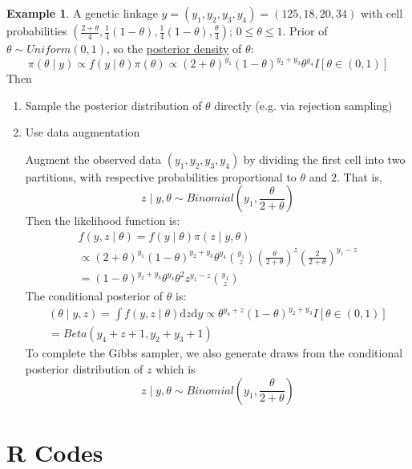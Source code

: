 \documentclass[lecture,12pt,]{pcms-l}
\numberwithin{section}{chapter}
\numberwithin{equation}{chapter}
\theoremstyle{plain}
\theoremstyle{definition}
\newtheorem{example}{Example}[section]
\theoremstyle{definition}
\begin{document}
\begin{example}
A genetic linkage $y=(y_1,y_2,y_3,y_4)=(125,18,20,34)$ with cell probabilities $(\frac{2+\theta}{4},\frac{1}{4}(1-\theta),\frac{1}{4}(1-\theta),\frac{\theta}{4})$; $0 \leq \theta \leq 1$. Prior of $\theta \sim Uniform(0,1)$, so the \underline{posterior density} of $\theta$:
\begin{equation*}
\pi(\theta \mid y) \propto f(y \mid \theta)\pi(\theta) \propto (2+\theta)^{y_1}(1-\theta)^{y_2 +y_3}\theta^{y_4}I \left [ \theta \in (0,1) \right ]
\end{equation*}
Then
\begin{enumerate}
\item Sample the posterior distribution of $\theta$ directly (e.g. via rejection sampling)
\item Use data augmentation

Augment the observed data $(y_1,y_2,y_3,y_4)$ by dividing the first cell into two partitions, with respective probabilities proportional to $\theta$ and $2$. That is,
\begin{equation*}
z \mid y, \theta \sim Binomial (y_1,\frac{\theta}{2+\theta})
\end{equation*}
Then the likelihood function is:
\begin{equation*}
\begin{split}
f(y,z \mid \theta) = f(y \mid \theta) \pi(z \mid y, \theta) 
\\
\propto (2+\theta)^{y_1}(1-\theta)^{y_2 +y_3}\theta^{y_4} \binom{y_1}{z}(\frac{\theta}{2+\theta})^z (\frac{2}{2+\theta})^{y_1-z}
\\
=(1-\theta)^{y_2 +y_3} \theta^{y_4} \theta^{2} z^{y_1-z} \binom{y_1}{z}
\end{split}
\end{equation*}
The conditional posterior of $\theta$ is:
\begin{equation*}
\begin{split}
(\theta \mid y,z)=\int f(y,z \mid \theta) \mathrm{d}z \mathrm{d}y \propto \theta^{y_4+z} (1-\theta)^{y_2 +y_3} I \left [ \theta \in (0,1) \right ]
\\
= Beta(y_4+z+1,y_2+y_3+1)
\end{split}
\end{equation*}
To complete the Gibbs sampler, we also generate draws from the conditional posterior distribution of $z$ which is
\begin{equation*}
z \mid y,\theta \sim Binomial(y_1,\frac{\theta}{2+\theta})
\end{equation*}
\end{enumerate}
\end{example}
\chapter*{R Codes}









\end{document}
